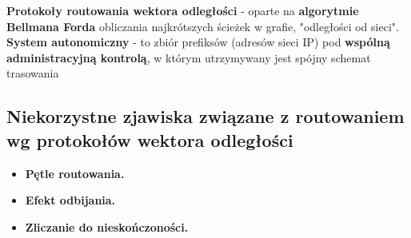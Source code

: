\documentclass[../main.tex]{subfiles}
\begin{document}
    \textbf{Protokoły routowania wektora odległości} - oparte na \textbf{algorytmie Bellmana Forda} obliczania najkrótszych ścieżek w grafie, "odległości od sieci".\\

    \textbf{System autonomiczny} - to zbiór prefiksów (adresów sieci IP) pod \textbf{wspólną administracyjną kontrolą}, w którym utrzymywany jest spójny schemat trasowania


    \subsection{Niekorzystne zjawiska związane z routowaniem wg protokołów wektora odległości}
    \begin{itemize}
        \item \textbf{Pętle routowania.}
        \item \textbf{Efekt odbijania.}
        \item \textbf{Zliczanie do nieskończoności.}
    \end{itemize}
\end{document}
